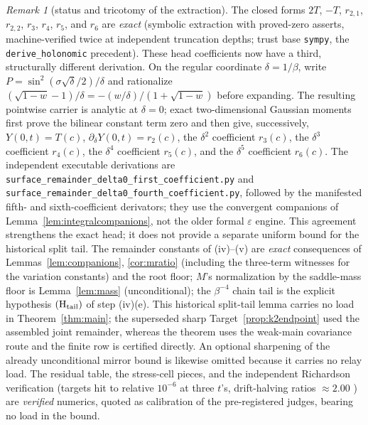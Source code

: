 \documentclass[11pt]{article}
\theoremstyle{remark}
\newtheorem{remark}[theorem]{Remark}
\begin{document}
\begin{remark}[status and tricotomy of the extraction]
\label{rem:extractionstatus}
The closed forms $2T$, $-T$, $r_{2,1}$, $r_{2,2}$, $r_3$, $r_4$, $r_5$, and $r_6$ are
\emph{exact} \textup{(}symbolic extraction with proved-zero
asserts, machine-verified twice at independent truncation depths;
trust base \texttt{sympy}, the \texttt{derive\_holonomic}
precedent\textup{)}.
These head coefficients now have a third, structurally different
derivation.  On the regular coordinate $\delta=1/\beta$, write
$P=\sin^2(\sigma\sqrt\delta/2)/\delta$ and rationalize
$(\sqrt{1-w}-1)/\delta=-(w/\delta)/(1+\sqrt{1-w})$ before expanding.
The resulting pointwise carrier is analytic at $\delta=0$; exact
two-dimensional Gaussian moments first prove the bilinear constant term
zero and then give, successively,
$Y(0,t)=T(c)$, $\partial_\delta Y(0,t)=r_2(c)$, the
$\delta^2$ coefficient $r_3(c)$, the $\delta^3$ coefficient $r_4(c)$,
the $\delta^4$ coefficient $r_5(c)$, and the $\delta^5$ coefficient
$r_6(c)$.
The independent executable derivations are
\nolinkurl{surface_remainder_delta0_first_coefficient.py} and
\nolinkurl{surface_remainder_delta0_fourth_coefficient.py}, followed by
the manifested fifth- and sixth-coefficient derivators; they use the
convergent companions of Lemma~\ref{lem:integralcompanions}, not the older
formal $\varepsilon$ engine.  This agreement strengthens the exact head; it
does not provide a separate uniform bound for the historical split tail.
The remainder constants of
\textup{(iv)}--\textup{(v)} are \emph{exact} consequences of
Lemmas~\ref{lem:companions}, \ref{cor:mratio} \textup{(}including
the three-term witnesses for the variation constants\textup{)} and
the root floor; $M$'s normalization by the saddle-mass floor is
Lemma~\ref{lem:mass} \textup{(}unconditional\textup{)}; the
$\beta^{-4}$ chain tail is the explicit hypothesis
$(\mathrm H_{\rm tail})$ of step \textup{(iv)(e)}.
This historical split-tail lemma carries no load in
Theorem~\ref{thm:main}; the superseded sharp
Target~\ref{prop:k2endpoint} used the assembled joint remainder, whereas
the theorem uses the weak-main covariance route and the finite row is
certified directly.
An optional sharpening of the already unconditional mirror bound is
likewise omitted because it carries no relay load.
The residual table, the stress-cell pieces, and the independent
Richardson verification \textup{(}targets hit to relative
$10^{-6}$ at three $t$'s, drift-halving ratios $\approx2.00$%
\textup{)} are \emph{verified} numerics, quoted as calibration of
the pre-registered judges, bearing no load in the bound.
\end{remark}
\end{document}
